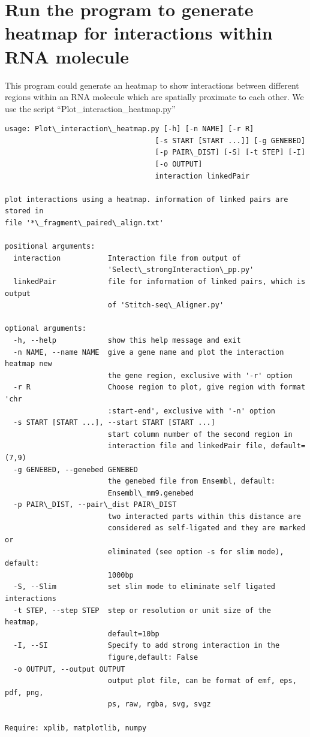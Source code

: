 \documentclass[letterpaper,10pt,english]{sphinxmanual}
\begin{document}
\section{Run the program to generate heatmap for interactions within RNA molecule}
\label{Visualization:run-the-program-to-generate-heatmap-for-interactions-within-rna-molecule}
This program could generate an heatmap to show interactions between different regions within an RNA molecule which are spatially proximate to each other. We use the script ``Plot\_interaction\_heatmap.py''

\begin{Verbatim}[commandchars=\\\{\}]
usage: Plot\_interaction\_heatmap.py [-h] [-n NAME] [-r R]
                                   [-s START [START ...]] [-g GENEBED]
                                   [-p PAIR\_DIST] [-S] [-t STEP] [-I]
                                   [-o OUTPUT]
                                   interaction linkedPair

plot interactions using a heatmap. information of linked pairs are stored in
file '*\_fragment\_paired\_align.txt'

positional arguments:
  interaction           Interaction file from output of
                        'Select\_strongInteraction\_pp.py'
  linkedPair            file for information of linked pairs, which is output
                        of 'Stitch-seq\_Aligner.py'

optional arguments:
  -h, --help            show this help message and exit
  -n NAME, --name NAME  give a gene name and plot the interaction heatmap new
                        the gene region, exclusive with '-r' option
  -r R                  Choose region to plot, give region with format 'chr
                        :start-end', exclusive with '-n' option
  -s START [START ...], --start START [START ...]
                        start column number of the second region in
                        interaction file and linkedPair file, default=(7,9)
  -g GENEBED, --genebed GENEBED
                        the genebed file from Ensembl, default:
                        Ensembl\_mm9.genebed
  -p PAIR\_DIST, --pair\_dist PAIR\_DIST
                        two interacted parts within this distance are
                        considered as self-ligated and they are marked or
                        eliminated (see option -s for slim mode), default:
                        1000bp
  -S, --Slim            set slim mode to eliminate self ligated interactions
  -t STEP, --step STEP  step or resolution or unit size of the heatmap,
                        default=10bp
  -I, --SI              Specify to add strong interaction in the
                        figure,default: False
  -o OUTPUT, --output OUTPUT
                        output plot file, can be format of emf, eps, pdf, png,
                        ps, raw, rgba, svg, svgz

Require: xplib, matplotlib, numpy
\end{Verbatim}
\end{document}

